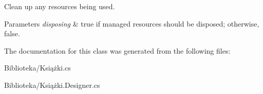 Clean up any resources being used. 


\begin{DoxyParams}{Parameters}
{\em disposing} & true if managed resources should be disposed; otherwise, false.\\
\hline
\end{DoxyParams}


The documentation for this class was generated from the following files\+:\begin{DoxyCompactItemize}
\item 
Biblioteka/Książki.\+cs\item 
Biblioteka/Książki.\+Designer.\+cs\end{DoxyCompactItemize}
